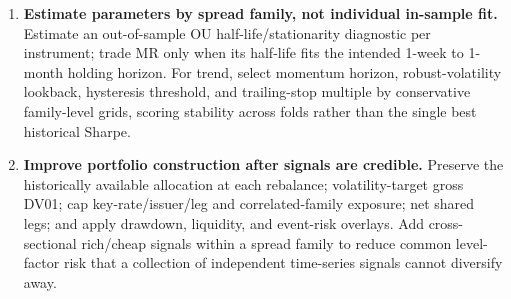 \begin{enumerate}
\item \textbf{Estimate parameters by spread family, not individual in-sample fit.}
Estimate an out-of-sample OU half-life/stationarity diagnostic per instrument; trade
MR only when its half-life fits the intended 1-week to 1-month holding horizon. For
trend, select momentum horizon, robust-volatility lookback, hysteresis threshold,
and trailing-stop multiple by conservative family-level grids, scoring stability
across folds rather than the single best historical Sharpe.

\item \textbf{Improve portfolio construction after signals are credible.} Preserve the
historically available allocation at each rebalance; volatility-target gross DV01;
cap key-rate/issuer/leg and correlated-family exposure; net shared legs; and apply
drawdown, liquidity, and event-risk overlays. Add cross-sectional rich/cheap
signals within a spread family to reduce common level-factor risk that a collection
of independent time-series signals cannot diversify away.
\end{enumerate}
